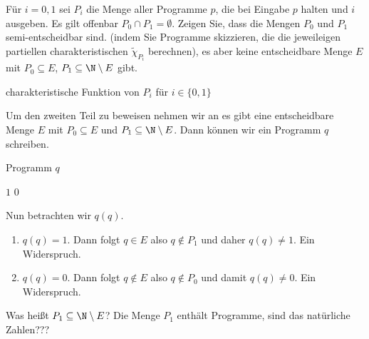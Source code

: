 
\begin{exercise}[224]

\phantom{}
	Für $i = 0,1$ sei $P_i$ die Menge aller Programme $p$, die bei Eingabe $p$ halten und $i$ ausgeben. Es gilt offenbar $P_0 \cap P_1 = \emptyset$. Zeigen Sie, dass die Mengen $P_0$ und $P_1$ semi-entscheidbar sind. (indem Sie Programme skizzieren, die die jeweileigen partiellen charakteristischen $\tilde{\chi}_{P_i}$ berechnen), es aber keine entscheidbare Menge $E$ mit $P_0 \subseteq E$, $P_1 \subseteq \N \setminus E$ gibt.  

\end{exercise}


\begin{solution}

\phantom{}

	\begin{algorithm}
		\caption{charakteristische Funktion von $P_i$ für $i \in \{0,1\}$}
		\begin{algorithmic}[1]
					\State {}
				\EndIf
			\EndProcedure
		\end{algorithmic}
	\end{algorithm}

	Um den zweiten Teil zu beweisen nehmen wir an es gibt eine entscheidbare Menge $E$ mit $P_0 \subseteq E$ und $P_1 \subseteq \N \setminus E$. Dann können wir ein Programm $q$ schreiben. 
	
	\begin{algorithm}
		\caption{Programm $q$}
		\begin{algorithmic}[1]
			\Procedure{$q$}{$p$}
				\If{$\chi_E(p) = 1$} 
					\State \Return $1$
				\Else
					\State \Return$0$
				\EndIf
			\EndProcedure
		\end{algorithmic}
	\end{algorithm}

	Nun betrachten wir $q(q)$. 
	\begin{enumerate}[label = Fall \arabic*:]
		\item $q(q) = 1$. Dann folgt $q \in E$ also $q \notin P_1$ und daher $q(q) \neq 1$. Ein Widerspruch.
		
		\item $q(q) = 0$. Dann folgt $q \notin E$ also $q \notin P_0$ und damit $q(q) \neq 0$. Ein Widerspruch.
	\end{enumerate}

	Was heißt $P_1 \subseteq \N \setminus E$? Die Menge $P_1$ enthält Programme, sind das natürliche Zahlen???
\end{solution}
